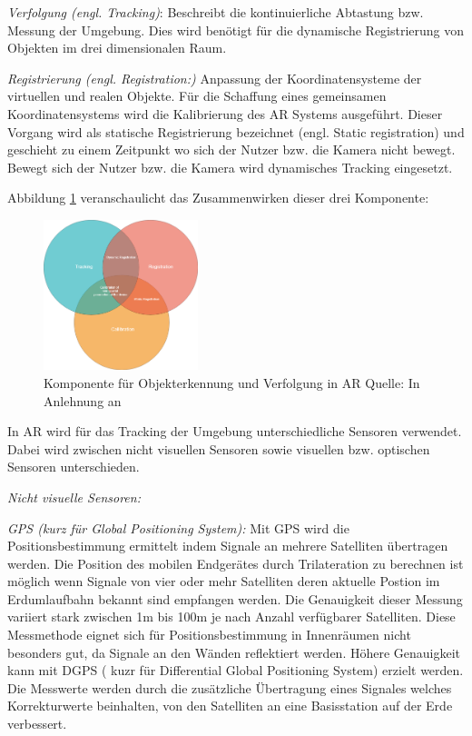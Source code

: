 \textit{Verfolgung (engl. Tracking)}: Beschreibt die kontinuierliche Abtastung bzw. Messung der Umgebung. Dies wird benötigt für die dynamische Registrierung von Objekten im drei dimensionalen Raum. 

\textit{Registrierung (engl. Registration:)} Anpassung der Koordinatensysteme der virtuellen und realen Objekte. Für die Schaffung eines gemeinsamen Koordinatensystems wird die Kalibrierung des AR Systems 
ausgeführt. Dieser Vorgang wird als statische Registrierung bezeichnet (engl. Static registration) und geschieht zu einem Zeitpunkt wo sich der Nutzer bzw. die Kamera nicht bewegt. Bewegt sich der 
Nutzer bzw. die Kamera wird dynamisches Tracking eingesetzt. 

Abbildung \ref{img:komponentsoftracking} veranschaulicht das Zusammenwirken dieser drei Komponente:

\begin{figure}[H]
	\centering
	\includegraphics[width=0.4\textwidth]{resources/fundamentals/Tracking.png}
	\caption{Komponente für Objekterkennung und Verfolgung in AR Quelle: In Anlehnung an \cite[S.~86]{DieterSchmalstieg2016}}
	\label{img:komponentsoftracking}
\end{figure}

In AR wird für das Tracking der Umgebung unterschiedliche Sensoren verwendet. Dabei wird zwischen nicht visuellen Sensoren sowie visuellen bzw. optischen Sensoren  unterschieden. 

\textit{Nicht visuelle Sensoren:}  

\textit{GPS (kurz für Global Positioning System):} Mit GPS wird die Positionsbestimmung ermittelt indem Signale an mehrere Satelliten übertragen werden. Die Position des mobilen Endgerätes durch Trilateration zu berechnen ist 
möglich wenn Signale von vier oder mehr Satelliten deren aktuelle Postion im Erdumlaufbahn bekannt sind empfangen werden. Die Genauigkeit dieser Messung variiert stark zwischen 1m bis 100m je nach Anzahl verfügbarer Satelliten. 
\cite[S.~2]{Arora2017}\cite[S.~100]{DieterSchmalstieg2016}Diese Messmethode eignet sich für Positionsbestimmung in Innenräumen nicht besonders gut, da Signale an den Wänden reflektiert werden. 
Höhere Genauigkeit kann mit  DGPS ( kuzr für Differential Global Positioning System) erzielt werden. Die Messwerte werden durch die zusätzliche Übertragung eines Signales welches Korrekturwerte beinhalten, von den Satelliten an eine Basisstation auf der Erde verbessert. \\


